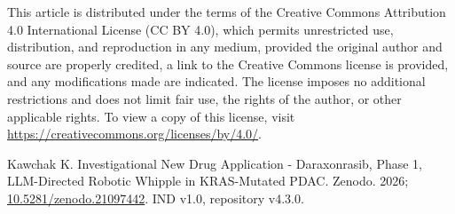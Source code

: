 This article is distributed under the terms of the Creative Commons Attribution 4.0
International License (CC BY 4.0), which permits unrestricted use, distribution, and
reproduction in any medium, provided the original author and source are properly
credited, a link to the Creative Commons license is provided, and any modifications
made are indicated. The license imposes no additional restrictions and does not
limit fair use, the rights of the author, or other applicable rights. To view a
copy of this license, visit
\url{https://creativecommons.org/licenses/by/4.0/}.

Kawchak K. Investigational New Drug Application - Daraxonrasib, Phase 1, LLM-Directed Robotic Whipple in KRAS-Mutated PDAC. Zenodo. 2026;
\href{https://doi.org/10.5281/zenodo.21097442}{10.5281/zenodo.21097442}. IND v1.0,
repository v4.3.0.


\vspace{1.1cm}

\begingroup\raggedright\nocite{*}\endgroup
